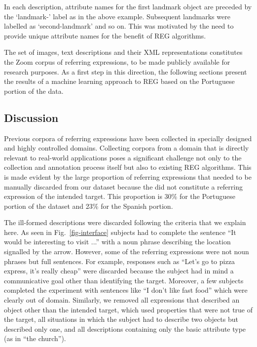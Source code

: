 \documentclass{article}
\begin{document}
In each description, attribute names for the first landmark object are preceded by the `landmark-' label as in the above example. Subsequent landmarks were labelled as `second-landmark' and so on. This was motivated by the need to provide unique attribute names for the benefit of REG algorithms.

The set of images, text descriptions and their XML representations constitutes the Zoom corpus of referring expressions, to be made publicly available for research purposes. As a first step in this direction, the following sections present the results of a machine learning approach to REG based on the Portuguese portion of the data.




\subsection{Discussion}
\label{sec-problems}

Previous corpora of referring expressions have been collected in specially designed and highly controlled domains. Collecting corpora from a domain that is directly relevant to real-world applications poses a significant challenge not only to the collection and annotation process itself but also to existing REG algorithms. This is made evident by the large proportion of referring expressions that needed to be manually discarded from our dataset because the did not constitute a referring expression of the intended target. This proportion is 30\% for the Portuguese portion of the dataset and 23\% for the Spanish portion. 

The ill-formed descriptions were discarded following the criteria that we explain here. As seen in Fig.~\ref{fig-interface} subjects had to complete the sentence ``It would be interesting to visit ...'' with a noun phrase describing the location signalled by the arrow. However, some of the referring expressions were not noun phrases but full sentences. For example, responses such as ``Let's go to pizza express, it's really cheap'' were discarded because the subject had in mind a communicative goal other than identifying the target. Moreover, a few subjects completed the experiment with sentences like ``I don't like fast food'' which were clearly out of domain. Similarly, we removed all expressions that described an object other than the intended target, which used properties that were not true of the target, all situations in which the subject had to describe two objects but described only one, and all descriptions containing only the basic attribute type (as in ``the church'').
\end{document}
